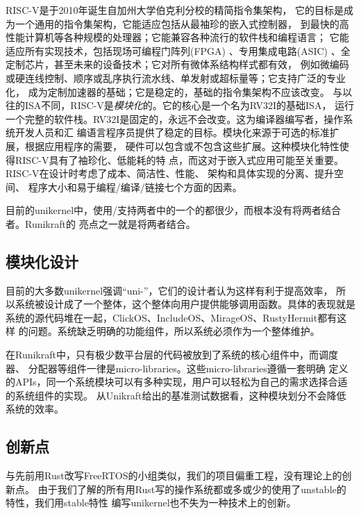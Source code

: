 \documentclass{../runikraft-report}
\begin{document}
RISC-V是于2010年诞生自加州大学伯克利分校的精简指令集架构，
它的目标是成为一个通用的指令集架构，它能适应包括从最袖珍的嵌入式控制器，
到最快的高性能计算机等各种规模的处理器；它能兼容各种流行的软件栈和编程语言；
它能适应所有实现技术，包括现场可编程门阵列(FPGA)
 、专用集成电路(ASIC) 、全定制芯片，甚至未来的设备技术；它对所有微体系结构样式都有效，
例如微编码或硬连线控制、顺序或乱序执行流水线、单发射或超标量等；它支持广泛的专业化，
成为定制加速器的基础；它是稳定的，基础的指令集架构不应该改变。\cite{bib:risc-v-manual}
与以往的ISA不同，RISC-V是\textit{模块化}的。它的核心是一个名为RV32I的基础ISA，
运行一个完整的软件栈。RV32I是固定的，永远不会改变。这为编译器编写者，操作系统开发人员和汇
编语言程序员提供了稳定的目标。模块化来源于可选的标准扩展，根据应用程序的需要，
硬件可以包含或不包含这些扩展。这种模块化特性使得RISC-V具有了袖珍化、低能耗的特
点，而这对于嵌入式应用可能至关重要。RISC-V在设计时考虑了成本、简洁性、性能、
架构和具体实现的分离、提升空间、
程序大小和易于编程/编译/链接七个方面的因素。

目前的unikernel中，使用/支持两者中的一个的都很少，而根本没有将两者结合者。Runi\-kraft的
亮点之一就是将两者结合。

\subsection{模块化设计}
目前的大多数unikernel强调“uni-”，它们的设计者认为这样有利于提高效率，
所以系统被设计成了一个整体，这个整体向用户提供能够调用函数。具体的表现就是
系统的源代码堆在一起，ClickOS、IncludeOS、MirageOS、RustyHermit都有这样
的问题。系统缺乏明确的功能组件，所以系统必须作为一个整体维护。

在Runikraft中，只有极少数平台层的代码被放到了系统的核心组件中，而调度器、
分配器等组件一律是micro-libraries。这些micro-libraries遵循一套明确
定义的APIs，同一个系统模块可以有多种实现，用户可以轻松为自己的需求选择合适的系统组件的实现。
从Unikraft给出的基准测试数据看，这种模块划分不会降低系统的效率。

\subsection{创新点}
与先前用Rust改写FreeRTOS的小组类似，我们的项目偏重工程，没有理论上的创新点。
由于我们了解的所有用Rust写的操作系统都或多或少的使用了unstable的特性，我们用stable特性
编写unikernel也不失为一种技术上的创新。
\end{document}
